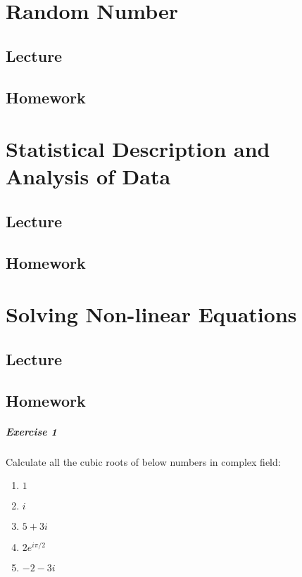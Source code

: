 \documentclass[openany]{book}
\begin{document}
\chapter{Random Number}
\section{Lecture}

\section{Homework}








\chapter{Statistical Description and Analysis of Data}
\section{Lecture}

\section{Homework}




\chapter{Solving Non-linear Equations}
\section{Lecture}


\section{Homework}
\paragraph{Exercise 1}
Calculate all the cubic roots of below numbers in complex field:
\begin{enumerate}
\item $1$
\item $i$
\item $5+3i$
\item $2 e ^{i\pi/2}$
\item $-2-3i$
\end{enumerate}

\end{document}
